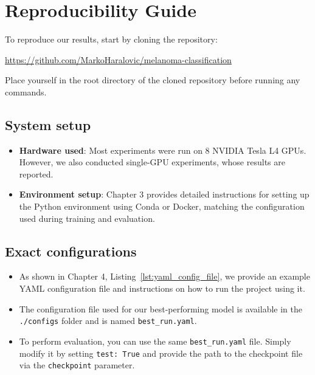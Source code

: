\chapter{Reproducibility Guide}
\label{ch:reproducibility}

To reproduce our results, start by cloning the repository:

\url{https://github.com/MarkoHaralovic/melanoma-classification}

Place yourself in the root directory of the cloned repository before running any commands.

\section{System setup}
\begin{itemize}
    \item \textbf{Hardware used}: Most experiments were run on 8 NVIDIA Tesla L4 GPUs. However, we also conducted single-GPU experiments, whose results are reported.
    \item \textbf{Environment setup}: Chapter 3 provides detailed instructions for setting up the Python environment using Conda or Docker, matching the configuration used during training and evaluation.
\end{itemize}

\section{Exact configurations}
\begin{itemize}
    \item As shown in Chapter 4, Listing~\ref{lst:yaml_config_file}, we provide an example YAML configuration file and instructions on how to run the project using it.
    \item The configuration file used for our best-performing model is available in the \texttt{./configs} folder and is named \texttt{best\_run.yaml}.
    \item To perform evaluation, you can use the same \texttt{best\_run.yaml} file. Simply modify it by setting \texttt{test: True} and provide the path to the checkpoint file via the \texttt{checkpoint} parameter.
\end{itemize}


